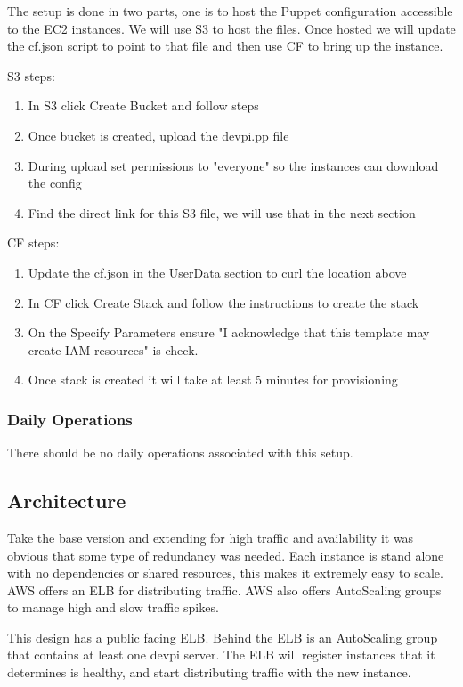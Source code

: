 \documentclass[12pt, letterpaper]{article}
\begin{document}
The setup is done in two parts, one is to host the Puppet configuration accessible to the EC2 instances. We will use
S3 to host the files. Once hosted we will update the cf.json script to point to that file and then use CF to bring
up the instance.

S3 steps:
\begin{enumerate}
    \item In S3 click Create Bucket and follow steps
    \item Once bucket is created, upload the devpi.pp file
    \item During upload set permissions to "everyone" so the instances can download the config
    \item Find the direct link for this S3 file, we will use that in the next section
\end{enumerate}

CF steps:
\begin{enumerate}
    \item Update the cf.json in the UserData section to curl the location above
    \item In CF click Create Stack and follow the instructions to create the stack
    \item On the Specify Parameters ensure "I acknowledge that this template may create IAM resources" is check.  
    \item Once stack is created it will take at least 5 minutes for provisioning
\end{enumerate}

\subsubsection{Daily Operations}
There should be no daily operations associated with this setup.

\subsection{Architecture}
Take the base version and extending for high traffic and availability it was obvious that some type of redundancy was needed. 
Each instance is stand alone with no dependencies or shared resources, this makes it extremely easy to scale. AWS offers an 
ELB for distributing traffic. AWS also offers AutoScaling groups to manage high and slow traffic spikes.


This design has a public facing ELB. Behind the ELB is an AutoScaling group that contains at least one devpi
server. The ELB will register instances that it determines is healthy, and start distributing traffic with the new instance.   
\end{document}
